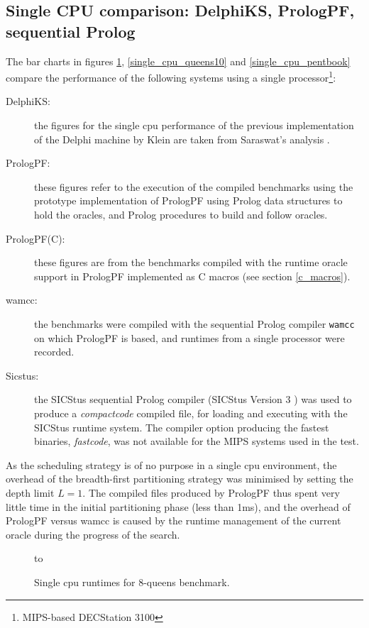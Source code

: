 \subsection{Single CPU comparison: DelphiKS, PrologPF, sequential Prolog}

The bar charts in figures \ref{single_cpu_queens8}, \ref{single_cpu_queens10}
and \ref{single_cpu_pentbook} compare the performance of the following
systems using a single processor\footnote{MIPS-based DECStation 3100}:
\begin{description}
\item[DelphiKS:]{ the figures for the single cpu performance of the
  previous implementation of the Delphi machine by Klein \cite{Kle91} are taken
  from Saraswat's analysis \cite{Sar95}.}
\item[PrologPF:]{ these figures refer to the execution of the compiled
  benchmarks using the prototype implementation of PrologPF using Prolog
  data structures to hold the oracles, and Prolog procedures to build and
  follow oracles.}
\item[PrologPF(C):]{ these figures are from the benchmarks compiled
  with the runtime oracle support in PrologPF implemented as C macros
  (see section \ref{c_macros}).}
\item[wamcc:]{ the benchmarks were compiled with the sequential Prolog
  compiler \texttt{wamcc} on which PrologPF is based, and runtimes from
  a single processor were recorded.}
\item[Sicstus:]{ the SICStus sequential Prolog compiler
  (SICStus Version 3 \cite{BBP+94})
  was used to produce a \textit{compactcode} compiled file, for loading and
  executing with the SICStus runtime system.  The compiler option producing
  the fastest binaries,
  \textit{fastcode}, was not available for the MIPS systems used in the
  test.}
\end{description}

As the scheduling strategy is of no purpose
in a single cpu environment, the overhead of the 
breadth-first partitioning strategy was minimised by setting the depth
limit $L=1$.  The compiled files produced by PrologPF thus spent very little
time in the initial partitioning phase (less than 1ms), and the overhead of
PrologPF versus wamcc is caused by the runtime management of the current
oracle during the progress of the search.
\begin{figure}[htb]
\vspace{5mm} \hbox to 
\caption{Single cpu runtimes for 8-queens benchmark.}
\vspace{5mm}
\label{single_cpu_queens8}
\end{figure}

